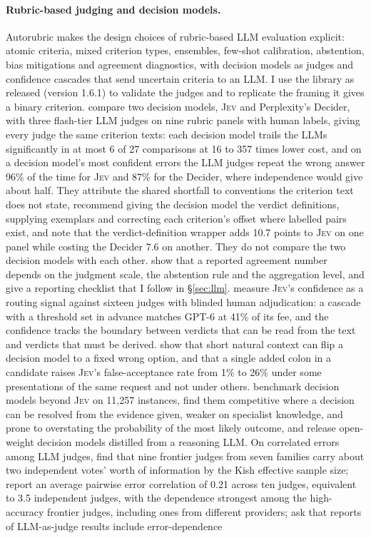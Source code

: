 \documentclass[11pt,a4paper]{article}
\newcommand{\jev}{\textsc{Jev}}
\begin{document}
\paragraph{Rubric-based judging and decision models.}
Autorubric \citep{rao2026autorubric} makes the design choices of rubric-based LLM evaluation explicit: atomic criteria, mixed criterion types, ensembles, few-shot calibration, abstention, bias mitigations and agreement diagnostics, with decision models as judges and confidence cascades that send uncertain criteria to an LLM. I use the library as released (version 1.6.1) to validate the judges and to replicate the framing it gives a binary criterion. \citet{rao2026jev} compare two decision models, \jev{} and Perplexity's Decider, with three flash-tier LLM judges on nine rubric panels with human labels, giving every judge the same criterion texts: each decision model trails the LLMs significantly in at most 6 of 27 comparisons at 16 to 357 times lower cost, and on a decision model's most confident errors the LLM judges repeat the wrong answer 96\% of the time for \jev{} and 87\% for the Decider, where independence would give about half. They attribute the shared shortfall to conventions the criterion text does not state, recommend giving the decision model the verdict definitions, supplying exemplars and correcting each criterion's offset where labelled pairs exist, and note that the verdict-definition wrapper adds 10.7 points to \jev{} on one panel while costing the Decider 7.6 on another. They do not compare the two decision models with each other. \citet{rao2026agreement} show that a reported agreement number depends on the judgment scale, the abstention rule and the aggregation level, and give a reporting checklist that I follow in \S\ref{sec:llm}. \citet{li2026jevjudge} measure \jev{}'s confidence as a routing signal against sixteen judges with blinded human adjudication: a cascade with a threshold set in advance matches GPT-6 at 41\% of its fee, and the confidence tracks the boundary between verdicts that can be read from the text and verdicts that must be derived. \citet{xu2026jevout} show that short natural context can flip a decision model to a fixed wrong option, and \citet{liu2026cues} that a single added colon in a candidate raises \jev{}'s false-acceptance rate from 1\% to 26\% under some presentations of the same request and not under others. \citet{duan2026jeval} benchmark decision models beyond \jev{} on 11,257 instances, find them competitive where a decision can be resolved from the evidence given, weaker on specialist knowledge, and prone to overstating the probability of the most likely outcome, and release open-weight decision models distilled from a reasoning LLM. On correlated errors among LLM judges, \citet{kohli2026nine} find that nine frontier judges from seven families carry about two independent votes' worth of information by the Kish effective sample size; \citet{hossain2026agreement} report an average pairwise error correlation of 0.21 across ten judges, equivalent to 3.5 independent judges, with the dependence strongest among the high-accuracy frontier judges, including ones from different providers; \citet{yang2026judge} ask that reports of LLM-as-judge results include error-dependence 
\end{document}

